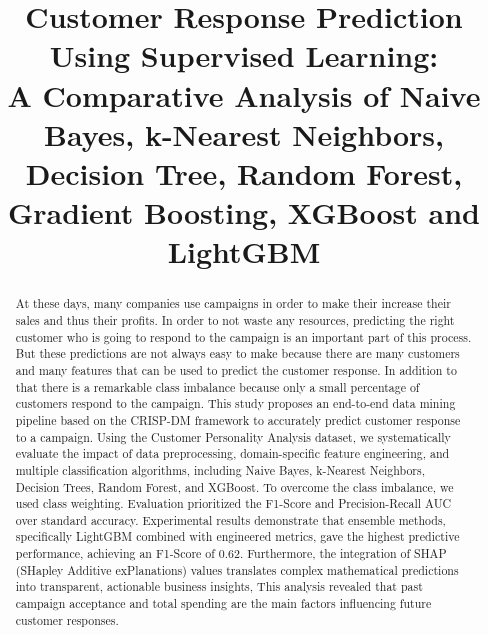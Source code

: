 \documentclass[conference]{IEEEtran}
\begin{document}
\title{Customer Response Prediction Using Supervised Learning: \\
A Comparative Analysis of Naive Bayes, k-Nearest Neighbors, Decision Tree, Random Forest, Gradient Boosting, XGBoost and LightGBM
}

\author{
}

\maketitle

\begin{abstract}
At these days, many companies use campaigns in order to make their increase their sales and thus their profits. In order to not waste any resources, predicting the right customer who is going to respond to the campaign is an important part of this process.
But these predictions are not always easy to make because there are many customers and many features that can be used to predict the customer response. In addition to that there is a remarkable class imbalance because only a small percentage of customers respond to the campaign.
This study proposes an end-to-end data mining pipeline based on the CRISP-DM framework to accurately predict customer response to a campaign.
Using the Customer Personality Analysis dataset, we systematically evaluate the impact of  data preprocessing, domain-specific feature engineering, and multiple classification algorithms, including Naive Bayes, k-Nearest Neighbors, Decision Trees, Random Forest, and XGBoost.
To overcome the class imbalance, we used class weighting. Evaluation prioritized the F1-Score and Precision-Recall AUC over standard accuracy.
Experimental results demonstrate that ensemble methods, specifically LightGBM combined with engineered metrics, gave the highest predictive performance, achieving an F1-Score of 0.62.
Furthermore, the integration of SHAP (SHapley Additive exPlanations) values translates complex mathematical predictions into transparent, actionable business insights,
This analysis revealed that past campaign acceptance and total spending are the main factors influencing future customer responses.
\end{abstract}
\end{document}
